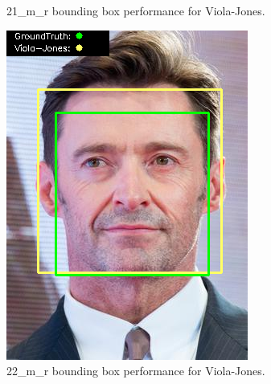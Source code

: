 \documentclass{l4proj}
\begin{document}
\begin{appendices}
\begin{figure}[h!]
\begin{minipage}{0.49\textwidth}
    \caption{21\_m\_r bounding box performance for Viola-Jones.}
    \label{whoopi_result}
  \end{minipage}
\end{figure}

\begin{figure}[h!]
  \centering
  \begin{minipage}{0.49\textwidth}
    \centering
     \includegraphics[width=\textwidth]{images/appendix/viola/22.png}
    \caption{22\_m\_r bounding box performance for Viola-Jones.}
    \label{whoopi_result}
  \end{minipage}
    \hfill
    \begin{minipage}{0.49\textwidth}
    \centering

\end{minipage}
\end{figure}
\end{appendices}
\end{document}
